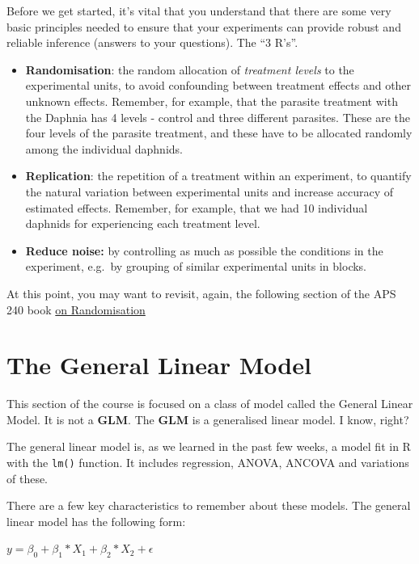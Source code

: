 \documentclass[
]{book}
\providecommand{\tightlist}{%
  \setlength{\itemsep}{0pt}\setlength{\parskip}{0pt}}
\begin{document}
Before we get started, it's vital that you understand that there are some very basic principles needed to ensure that your experiments can provide robust and reliable inference (answers to your questions). The ``3 R's''.

\begin{itemize}
\tightlist
\item
  \textbf{Randomisation}: the random allocation of \emph{treatment levels} to the experimental units, to avoid confounding between treatment effects and other unknown effects. Remember, for example, that the parasite treatment with the Daphnia has 4 levels - control and three different parasites. These are the four levels of the parasite treatment, and these have to be allocated randomly among the individual daphnids.
\item
  \textbf{Replication}: the repetition of a treatment within an experiment, to quantify the natural variation between experimental units and increase accuracy of estimated effects. Remember, for example, that we had 10 individual daphnids for experiencing each treatment level.
\item
  \textbf{Reduce noise:} by controlling as much as possible the conditions in the experiment, e.g.~by grouping of similar experimental units in blocks.
\end{itemize}

At this point, you may want to revisit, again, the following section of the APS 240 book \href{https://dzchilds.github.io/stats-for-bio/principles-experimental-design.html\#randomisation}{on Randomisation}

\hypertarget{the-general-linear-model}{%
\section{The General Linear Model}\label{the-general-linear-model}}

This section of the course is focused on a class of model called the General Linear Model. It is not a \textbf{GLM}. The \textbf{GLM} is a generalised linear model. I know, right?

The general linear model is, as we learned in the past few weeks, a model fit in R with the \texttt{lm()} function. It includes regression, ANOVA, ANCOVA and variations of these.

There are a few key characteristics to remember about these models. The general linear model has the following form:

\(y = \beta_{0}+\beta_{1}*X_{1}+\beta_{2}*X_{2}+\epsilon\)
\end{document}
